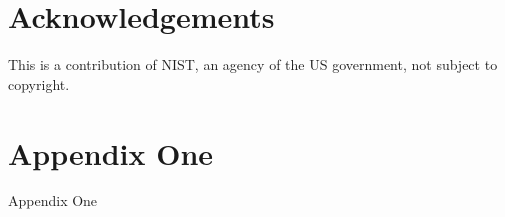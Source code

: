 \documentclass[onecolumn]{article}
\begin{document}
\section{Acknowledgements}

\vspace{1em}
\noindent This is a contribution of NIST, an agency of the US government, not subject to copyright.

\appendix

\section{\label{apx:one}Appendix One}
Appendix One

	

\end{document}
